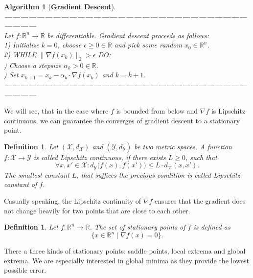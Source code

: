 \documentclass[11pt, a4paper]{article}
\newtheorem{definition}[theorem]{Definition}
\newtheorem{algorithm}[theorem]{Algorithm}
\newcommand{\R}{\mathds{R}}
\newcommand{\X}{\mathcal{X}}
\newcommand{\Y}{\mathcal{Y}}
\begin{document}
\begin{algorithm}[\textbf{Gradient Descent}] \ \\
\textbf{------------------------------------------------------------------------------------------------------} \\
Let $f: \R^n \to \R$ be differentiable. Gradient descent proceeds as follows: \\

1) Initialize $k=0$, choose $\epsilon \geq 0 \in \R$ and pick some random $x_0 \in \R^n$. \\

2) WHILE $ \big \| \nabla f(x_k) \big \|_2 > \epsilon $ DO:\\

) Choose a stepsize $\alpha_k > 0 \in \R$. \\

) Set $x_{k+1} = x_k - \alpha_k \cdot \nabla f(x_k)$ and $k = k+1$. \\
\textbf{------------------------------------------------------------------------------------------------------}
\end {algorithm}

We will see, that in the case where $f$ is bounded from below and $\nabla f$ is Lipschitz continuous, we can guarantee the  converges of gradient descent to a stationary point.

\begin{definition}
Let $(\X,d_{\X})$ and $(\Y, d_{\Y})$ be two metric spaces. A function $f: \X \to \Y$ is called Lipschitz continuous, if there exists $L \geq 0$, such that
\[ \forall x,x' \in \X : d_{\Y} \big ( f(x) , f(x') \big ) \leq L \cdot d_{\X}(x,x'). \]
The smallest constant $L$, that suffices the previous condition is called Lipschitz constant of $f$.
\end{definition}

Casually speaking, the Lipschitz continuity of $\nabla f$ ensures that the gradient does not change heavily for two points that are close to each other.

\begin{definition}
Let $f: \R^n \to \R$. The set of stationary points of $f$ is defined as
\[ \big \{ x \in \R^n \mid \nabla f(x) = 0 \big \}. \]
\end{definition}

There a three kinds of stationary points: saddle points, local extrema and global extrema. We are especially interested in global minima as they provide the lowest possible error.
\end{document}
